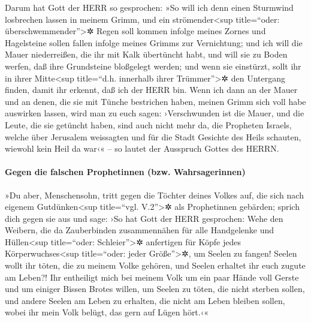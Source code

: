 Darum hat Gott der HERR so gesprochen: »So will ich denn
einen Sturmwind losbrechen lassen in meinem Grimm, und ein
strömender\textless sup title=``oder: überschwemmender''\textgreater✲
Regen soll kommen infolge meines Zornes und Hagelsteine sollen fallen
infolge meines Grimms zur Vernichtung; und ich will die
Mauer niederreißen, die ihr mit Kalk übertüncht habt, und will sie zu
Boden werfen, daß ihre Grundsteine bloßgelegt werden; und wenn sie
einstürzt, sollt ihr in ihrer Mitte\textless sup title=``d.h. innerhalb
ihrer Trümmer''\textgreater✲ den Untergang finden, damit ihr erkennt,
daß ich der HERR bin. Wenn ich dann an der Mauer und an
denen, die sie mit Tünche bestrichen haben, meinen Grimm sich voll habe
auswirken lassen, wird man zu euch sagen: ›Verschwunden ist die Mauer,
und die Leute, die sie getüncht haben, sind auch nicht mehr da,
die Propheten Israels, welche über Jerusalem weissagten
und für die Stadt Gesichte des Heils schauten, wiewohl kein Heil da
war‹« -- so lautet der Ausspruch Gottes des HERRN.

\hypertarget{gegen-die-falschen-prophetinnen-bzw.-wahrsagerinnen}{%
\paragraph{Gegen die falschen Prophetinnen (bzw.
Wahrsagerinnen)}\label{gegen-die-falschen-prophetinnen-bzw.-wahrsagerinnen}}

»Du aber, Menschensohn, tritt gegen die Töchter deines
Volkes auf, die sich nach eigenem Gutdünken\textless sup title=``vgl.
V.2''\textgreater✲ als Prophetinnen gebärden; sprich dich gegen sie aus
und sage: ›So hat Gott der HERR gesprochen: Wehe den
Weibern, die da Zauberbinden zusammennähen für alle Handgelenke und
Hüllen\textless sup title=``oder: Schleier''\textgreater✲ anfertigen für
Köpfe jedes Körperwuchses\textless sup title=``oder: jeder
Größe''\textgreater✲, um Seelen zu fangen! Seelen wollt ihr töten, die
zu meinem Volke gehören, und Seelen erhaltet ihr euch zugute am Leben?!
Ihr entheiligt mich bei meinem Volk um ein paar Hände
voll Gerste und um einiger Bissen Brotes willen, um Seelen zu töten, die
nicht sterben sollen, und andere Seelen am Leben zu erhalten, die nicht
am Leben bleiben sollen, wobei ihr mein Volk belügt, das gern auf Lügen
hört.‹«

